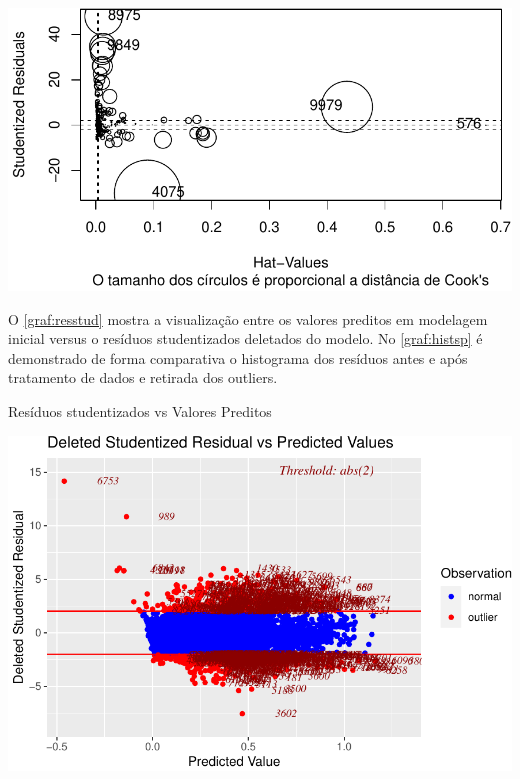 \documentclass[
  12pt,
  12pt,
  openright,
  oneside,
  a4paper,
  chapter=TITLE,
  section=TITLE,
  subsection=TITLE,
  subsubsection=TITLE,
  english,
  portugues,
  sumario=tradicional]{abntex2}
\begin{document}
\begin{apendicesenv}
\begin{grafico}[!htbp]
\begin{center}\includegraphics{12-exportedfigures/influence.plot-1} \end{center}
\vspace{-3mm}
\label{graf:influence}
\vspace{-2mm}
\end{grafico}

O \autoref{graf:resstud} mostra a visualização entre os valores preditos em modelagem inicial versus o resíduos studentizados deletados do modelo. No \autoref{graf:histsp} é demonstrado de forma comparativa o histograma dos resíduos antes e após tratamento de dados e retirada dos outliers. 

\begin{grafico}
\vspace{20pt}
\caption{Resíduos studentizados vs Valores Preditos}
\vspace{-4mm}

\begin{center}\includegraphics{12-exportedfigures/fit.01.graf-1} \end{center}
\vspace{-3mm}
\label{graf:resstud}
\vspace{-2mm}
\end{grafico}


\end{apendicesenv}
\end{document}
